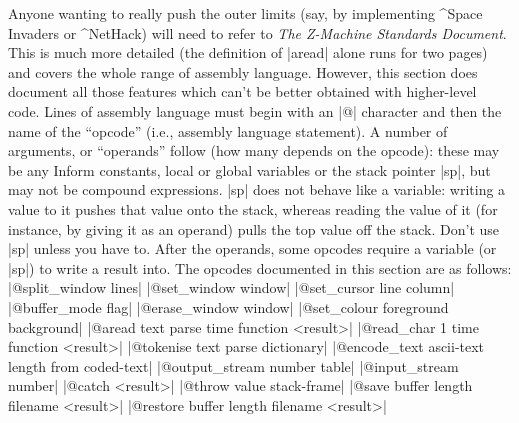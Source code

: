 Anyone wanting to really push the outer limits (say, by implementing
^{Space Invaders} or ^{NetHack}) will need to refer to {\sl The Z-Machine
Standards Document}.  This is much more detailed (the
definition of |aread| alone runs for two pages) and covers the whole range
of assembly language.  However, this section does document all those features
which can't be better obtained with higher-level code.
\bigskip
\noindent
Lines of assembly language must begin with an |@| character and then the
name of the ``opcode'' (i.e., assembly language statement).  A number of
arguments, or ``operands'' follow (how many depends on the opcode): these
may be any Inform constants, local or global variables or the stack pointer |sp|,
but may not be compound expressions.  |sp| does not behave like a variable:
writing a value to it pushes that value onto the stack, whereas reading
the value of it (for instance, by giving it as an operand) pulls the top
value off the stack.  Don't use |sp| unless you have to.  After the operands,
some opcodes require a variable (or |sp|) to write a result into.
The opcodes documented in this section are as follows:
\beginlines
|@split_window    lines|
|@set_window      window|
|@set_cursor      line column|
|@buffer_mode     flag|
|@erase_window    window|
|@set_colour      foreground background|
|@aread           text parse time function <result>|
|@read_char       1 time function <result>|
|@tokenise        text parse dictionary|
|@encode_text     ascii-text length from coded-text|
|@output_stream   number table|
|@input_stream    number|
|@catch           <result>|
|@throw           value stack-frame|
|@save            buffer length filename <result>|
|@restore         buffer length filename <result>|
\endlines

